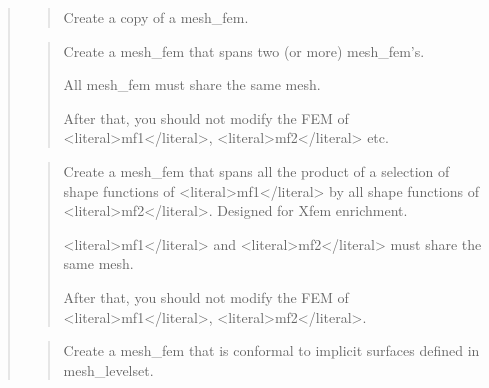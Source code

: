 \documentclass[a4paper,11pt,english]{sphinxmanual}
\begin{document}
\begin{quote}
\sphinxAtStartPar
{}
\begin{quote}

\sphinxAtStartPar
Create a copy of a mesh\_fem.
\end{quote}

\sphinxAtStartPar
{}
\begin{quote}

\sphinxAtStartPar
Create a mesh\_fem that spans two (or more) mesh\_fem’s.

\sphinxAtStartPar
All mesh\_fem must share the same mesh.

\sphinxAtStartPar
After that, you should not modify the FEM of \textless{}literal\textgreater{}mf1\textless{}/literal\textgreater{}, \textless{}literal\textgreater{}mf2\textless{}/literal\textgreater{} etc.
\end{quote}

\sphinxAtStartPar
{}
\begin{quote}

\sphinxAtStartPar
Create a mesh\_fem that spans all the product of a selection of shape
functions of \textless{}literal\textgreater{}mf1\textless{}/literal\textgreater{} by all shape functions of \textless{}literal\textgreater{}mf2\textless{}/literal\textgreater{}.
Designed for Xfem enrichment.

\sphinxAtStartPar
\textless{}literal\textgreater{}mf1\textless{}/literal\textgreater{} and \textless{}literal\textgreater{}mf2\textless{}/literal\textgreater{} must share the same mesh.

\sphinxAtStartPar
After that, you should not modify the FEM of \textless{}literal\textgreater{}mf1\textless{}/literal\textgreater{}, \textless{}literal\textgreater{}mf2\textless{}/literal\textgreater{}.
\end{quote}

\sphinxAtStartPar
{}
\begin{quote}

\sphinxAtStartPar
Create a mesh\_fem that is conformal to implicit surfaces defined in
mesh\_levelset.
\end{quote}


\end{quote}
\end{document}
